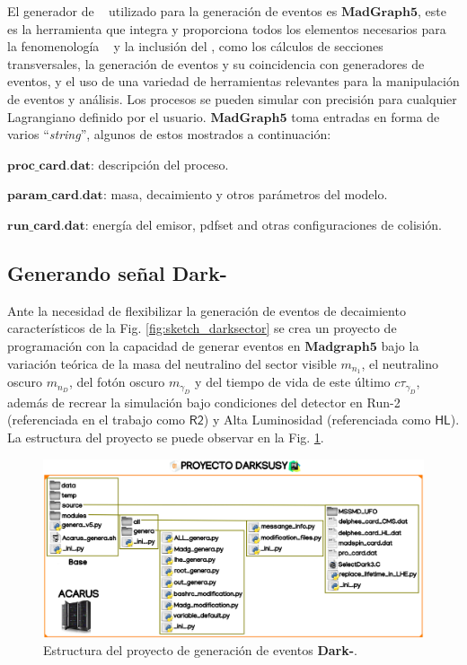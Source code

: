 El generador de \MC ~ utilizado para la generación de eventos es $\mathbf{MadGraph5}$, este es la herramienta que integra y proporciona todos los elementos necesarios para la fenomenología \ME ~ y la inclusión del \SUSY, como los cálculos de secciones transversales, la generación de eventos y su coincidencia con generadores de eventos, y el uso de una variedad de herramientas relevantes para la manipulación de eventos y análisis. Los procesos se pueden simular con precisión para cualquier Lagrangiano definido por el usuario. $\mathbf{MadGraph5}$ toma entradas en forma de varios ``\textit{string}'', algunos de estos mostrados a continuación:
\begin{itemize_f}
\item  $\mathbf{proc\_card.dat}$: descripción del proceso.
\item  $\mathbf{param\_card.dat}$: masa, decaimiento y otros parámetros del modelo.
\item  $\mathbf{run\_card.dat}$: energía del emisor, pdfset and otras configuraciones de colisión.
\end{itemize_f}




\subsection{Generando señal \textbf{Dark-}\SUSY}

Ante la necesidad de flexibilizar la generación de eventos de decaimiento característicos de la Fig. \ref{fig:sketch_darksector} se crea un proyecto de programación con la capacidad de generar eventos en $\mathbf{Madgraph5}$ bajo la variación teórica de la masa del neutralino del sector visible $m_{n_1}$, el neutralino oscuro $m_{n_D}$, del fotón oscuro $m_{\gamma_D}$ y del tiempo de vida de este último $c\tau_{\gamma_D}$, además de recrear la simulación bajo condiciones del detector en Run-2 (referenciada en el trabajo como $\textsf{R2}$) y Alta Luminosidad (referenciada como $\textsf{HL}$). La estructura del proyecto se puede observar en la Fig. \ref{genera_darksusy0}.

\begin{figure}[!ht]
\centering
\includegraphics[width=1\textwidth]{Cap3/imagenes/proyecto_darksusy.png}
\caption[Estructura del proyecto de generación de eventos \textbf{Dark-\SUSY}.]{Estructura del proyecto de generación de eventos \textbf{Dark-\SUSY}\footnotemark.}
\label{genera_darksusy0}
\end{figure}

